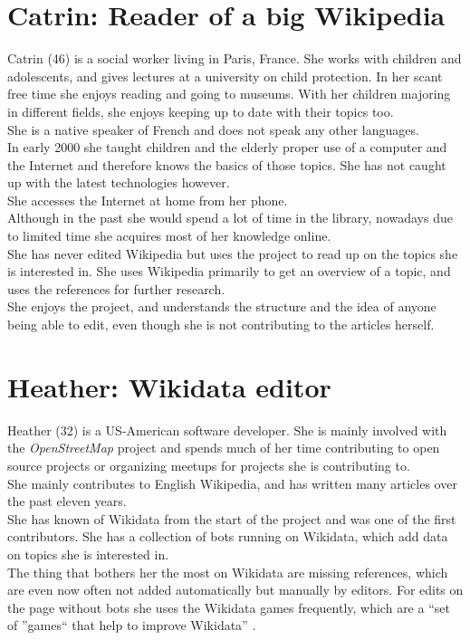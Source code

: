 \section{Catrin: Reader of a big Wikipedia}
Catrin (46) is a social worker living in Paris, France. She works with children and adolescents, and gives lectures at a university on child protection. In her scant free time she enjoys reading and going to museums. With her children majoring in different fields, she enjoys keeping up to date with their topics too. \\
She is a native speaker of French and does not speak any other languages. \\
In early 2000 she taught children and the elderly proper use of a computer and the Internet and therefore knows the basics of those topics. She has not caught up with the latest technologies however. \\
She accesses the Internet at home from her phone. \\
Although in the past she would spend a lot of time in the library, nowadays due to limited time she acquires most of her knowledge online. \\
She has never edited Wikipedia but uses the project to read up on the topics she is interested in. She uses Wikipedia primarily to get an overview of a topic, and uses the references for further research. \\
She enjoys the project, and understands the structure and the idea of anyone being able to edit, even though she is not contributing to the articles herself. \\


\section{Heather: Wikidata editor}
Heather (32) is a US-American software developer. She is mainly involved with the \textit{OpenStreetMap} project and spends much of her time contributing to open source projects or organizing meetups for projects she is contributing to. \\
She mainly contributes to English Wikipedia, and has written many articles over the past eleven years. \\
She has known of Wikidata from the start of the project and was one of the first contributors. She has a collection of bots running on Wikidata, which add data on topics she is interested in. \\
The thing that bothers her the most on Wikidata are missing references, which are even now often not added automatically but manually by editors. For edits on the page without bots she uses the Wikidata games frequently, which are a ``set of ''games`` that help to improve Wikidata'' \citep{wikidatagame}.
